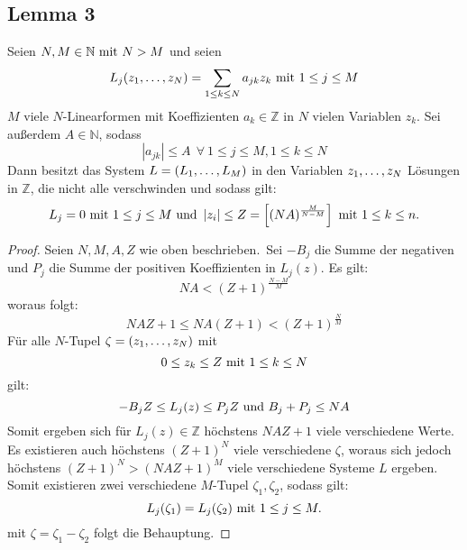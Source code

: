 
\subsection{Lemma 3}
    \label{subsec:lemma3}
    Seien $N, M \in \mathbb{N} \ \textrm{mit}\  N > M$ und seien
    \begin{equation*}
        L_j(z_1, \dots, z_N) = \sum_{1 \leq k \leq N} a_{jk} z_k \ \textrm{mit}\  1 \leq j \leq M
    \end{equation*}
    $M$ viele $N$-Linearformen mit Koeffizienten $a_k \in \mathbb{Z}$ in $N$ vielen Variablen $z_k$.
    \textrm{Sei außerdem} $A \in \mathbb{N}$, sodass
    \begin{equation*}
        \left| a_{jk} \right| \leq A \ \ \forall \ 1 \leq j \leq M, 1 \leq k \leq N
    \end{equation*}
    \textrm{Dann besitzt das System $L = (L_1, \dots, L_M)$ in den Variablen $z_1, \dots, z_N$ Lösungen in $\mathbb{Z}$,
    die nicht alle verschwinden und sodass gilt:}
    \begin{equation*}
        L_j = 0 \ \textrm{mit}\  1 \leq j \leq M \ \textrm{und}\  \left| z_i \right| \leq Z = \left[ (NA)^{\frac{M}{N-M}} \right]
        \ \textrm{mit}\  1 \leq k \leq n.
    \end{equation*}
    \begin{proof}
        Seien $N, M, A, Z$ wie oben beschrieben.\ Sei $- B_j$ die Summe der negativen und $P_j$ die Summe der positiven
        Koeffizienten in $L_j(z)$.
        \newline
        Es gilt:
        \begin{equation*}
            NA < (Z + 1)^{\frac{N-M}{M}}
        \end{equation*}
        woraus folgt:
        \begin{equation*}
            NAZ+1 \leq NA(Z + 1) < (Z + 1)^{\frac{N}{M}}
        \end{equation*}
        \textrm{Für alle} $N$-Tupel $\zeta = (z_1, \dots, z_N)$ mit
        \begin{equation}
            0 \leq z_k \leq Z \ \textrm{mit}\  1 \leq k \leq N \label{eq:z_k-condition}
        \end{equation}
        gilt:
        \begin{equation*}
            - B_j Z \leq L_j(z) \leq P_j Z \ \textrm{und}\  B_j + P_j \leq N A
        \end{equation*}
        \textrm{Somit ergeben sich für $L_j(z) \in \mathbb{Z}$ höchstens $NAZ+1$ viele verschiedene Werte. Es existieren
        auch höchstens $(Z + 1)^N$ viele verschiedene $\zeta$, woraus sich jedoch höchstens $(Z + 1)^N > (NAZ+1)^M$ viele
        verschiedene Systeme $L$ ergeben.}
        \newline
        Somit existieren zwei verschiedene $M$-Tupel $\zeta_1, \zeta_2$, sodass gilt:
        \begin{equation*}
            L_j(\zeta_1) = L_j(\zeta_2) \ \textrm{mit}\  1 \leq j \leq M.
        \end{equation*}
        mit $\zeta = \zeta_1 - \zeta_2$ folgt die Behauptung.
    \end{proof}

